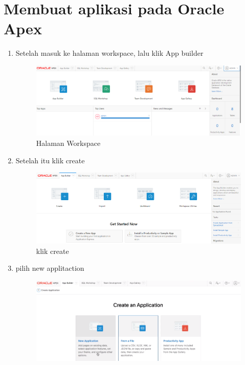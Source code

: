 \section{Membuat aplikasi pada Oracle Apex}
\begin{enumerate}
    \item Setelah masuk ke halaman workspace, lalu klik App builder
      \begin{figure}[!htbp]
        \centering
        \includegraphics[scale=0.4]{figures/wor1.PNG}
        \caption{Halaman Workspace}
    \end{figure}
    \newpage
         \item Setelah itu klik create
      \begin{figure}[!htbp]
        \centering
        \includegraphics[scale=0.4]{figures/create.PNG}
        \caption{klik create}
    \end{figure}
    \item  pilih new applitaction
      \begin{figure}[!htbp]
        \centering
        \includegraphics[scale=0.4]{figures/cara2.PNG}

\end{figure}
\end{enumerate}
